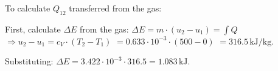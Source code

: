 To calculate \( Q_{12} \) transferred from the gas:  

First, calculate \( \Delta E \) from the gas:  
\( \Delta E = m \cdot (u_2 - u_1) = \int Q \)  
\( \Rightarrow u_2 - u_1 = c_V \cdot (T_2 - T_1) \)  
\( = 0.633 \cdot 10^{-3} \cdot (500 - 0) \)  
\( = 316.5 \, \text{kJ/kg} \).  

Substituting:  
\( \Delta E = 3.422 \cdot 10^{-3} \cdot 316.5 = 1.083 \, \text{kJ} \).